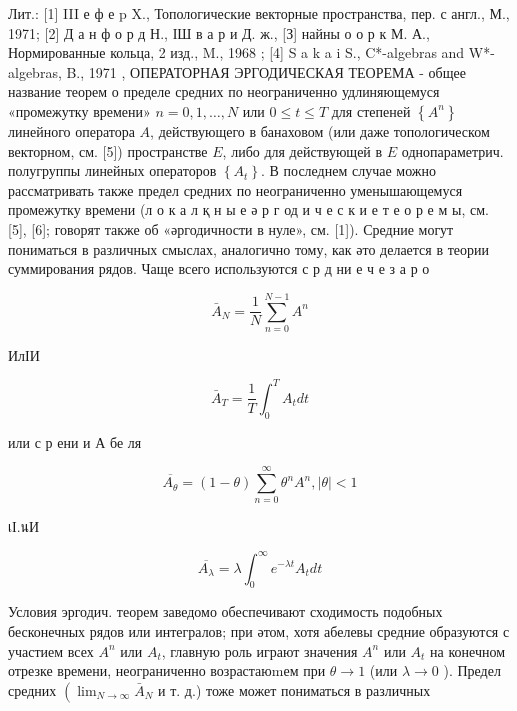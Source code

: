 \documentclass[10pt]{article}
\begin{document}
Лит.: [1] III е ф е p X., Топологические векторные пространства, пер. с англ., М., 1971; [2] Д а н ф о р д Н., ІШ в а р и Д. ж., [З] найны о о р к М. А., Нормированные кольца, 2 изд., M., 1968 ; [4] S a k a i S., C*-algebras and W*-algebras, B., 1971 , ОПЕРАТОРНАЯ ЭРГОДИЧЕСКАЯ ТЕОРЕМА - общее название теорем о пределе средних по неограниченно удлиняющемуся «промежутку времени» $n=0,1, \ldots, N$ или $0 \leqslant t \leqslant T$ для степеней $\left\{A^{n}\right\}$ линейного оператора $A$, действующего в банаховом (или даже топологическом векторном, см. [5]) пространстве $E$, либо для действующей в $E$ однопараметрич. полугруппы линейных операторов $\left\{A_{t}\right\}$. В последнем случае можно рассматривать также предел средних по неограниченно уменышающемуся промежутку времени (л о к а л қ н ы е ә р г од и ч е с к и е т е о р е м ы, см. [5], [6]; говорят также об «әргодичности в нуле», см. [1]). Средние могут пониматься в различных смыслах, аналогично тому, как әто делается в теории суммирования рядов. Чаще всего используются с р д ни е ч е з а р о



\[

\bar{A}_{N}=\frac{1}{N} \sum_{n=0}^{N-1} A^{n}

\]



ИлІИ



\[

\bar{A}_{T}=\frac{1}{T} \int_{0}^{T} A_{t} d t

\]



или с р ени и А бе ля



\[

\overline{A_{\theta}}=(1-\theta) \sum_{n=0}^{\infty} \theta^{n} A^{n},|\theta|<1

\]



เІ.นИ



\[

\overline{A_{\lambda}}=\lambda \int_{0}^{\infty} e^{-\lambda t} A_{t} d t

\]



Условия эргодич. теорем заведомо обеспечивают сходимость подобных бесконечных рядов или интегралов; при әтом, хотя абелевы средние образуются с участием всех $A^{n}$ или $A_{t}$, главную роль играют значения $A^{n}$ или $A_{t}$ на конечном отрезке времени, неограниченно возрастаюmем при $\theta \rightarrow 1$ (или $\lambda \rightarrow 0$ ). Предел средних $\left(\lim _{N \rightarrow \infty} \bar{A}_{N}\right.$ и т. д.) тоже может пониматься в различных
\end{document}
